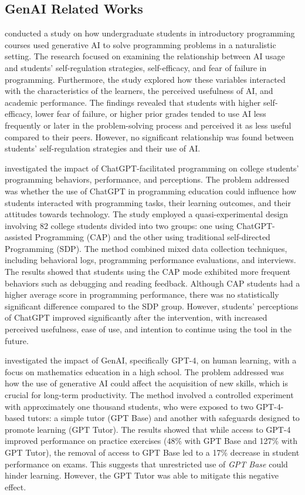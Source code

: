 \documentclass[runningheads]{llncs}
\begin{document}
\subsection{GenAI Related Works}

\cite{Margulieux24} conducted a study on how undergraduate students in
introductory programming courses used generative AI to solve programming
problems in a naturalistic setting. The research focused on examining the
relationship between AI usage and students’ self-regulation strategies,
self-efficacy, and fear of failure in programming. Furthermore, the study
explored how these variables interacted with the characteristics of the learners,
the perceived usefulness of AI, and academic performance. The findings revealed
that students with higher self-efficacy, lower fear of failure, or higher prior
grades tended to use AI less frequently or later in the problem-solving process
and perceived it as less useful compared to their peers. However, no significant
relationship was found between students’ self-regulation strategies and their
use of AI.

\cite{Boudouaia24} investigated the impact of ChatGPT-facilitated programming on
college students’ programming behaviors, performance, and perceptions. The
problem addressed was whether the use of ChatGPT in programming education could
influence how students interacted with programming tasks, their learning
outcomes, and their attitudes towards technology. The study employed a
quasi-experimental design involving 82 college students divided into two groups:
one using ChatGPT-assisted Programming (CAP) and the other using traditional
self-directed Programming (SDP). The method combined mixed data collection
techniques, including behavioral logs, programming performance evaluations, and
interviews. The results showed that students using the CAP mode exhibited more
frequent behaviors such as debugging and reading feedback. Although CAP students
had a higher average score in programming performance, there was no
statistically significant difference compared to the SDP group. However,
students’ perceptions of ChatGPT improved significantly after the intervention,
with increased perceived usefulness, ease of use, and intention to continue
using the tool in the future.

\cite{Bastani24} investigated the impact of GenAI, specifically GPT-4, on human
learning, with a focus on mathematics education in a high school. The problem
addressed was how the use of generative AI could affect the acquisition of new
skills, which is crucial for long-term productivity. The method involved a
controlled experiment with approximately one thousand students, who were exposed
to two GPT-4-based tutors: a simple tutor (GPT Base) and another with safeguards
designed to promote learning (GPT Tutor). The results showed that while access
to GPT-4 improved performance on practice exercises (48\% with GPT Base and
127\% with GPT Tutor), the removal of access to GPT Base led to a 17\% decrease
in student performance on exams. This suggests that unrestricted use of
\textit{GPT Base} could hinder learning. However, the GPT Tutor was able to
mitigate this negative effect.
\end{document}
